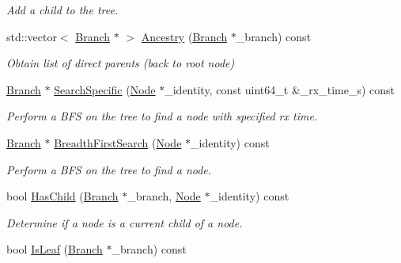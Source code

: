 \begin{DoxyCompactItemize}
\begin{DoxyCompactList}\small\item\em Add a child to the tree. \end{DoxyCompactList}\item 
std\+::vector$<$ \hyperlink{structosse_1_1collaborate_1_1_tree_1_1_branch}{Branch} $\ast$ $>$ \hyperlink{classosse_1_1collaborate_1_1_tree_ab7365c9a23acf7aac1070e0a9ee0c5d7}{Ancestry} (\hyperlink{structosse_1_1collaborate_1_1_tree_1_1_branch}{Branch} $\ast$\+\_\+branch) const
\begin{DoxyCompactList}\small\item\em Obtain list of direct parents (back to root node) \end{DoxyCompactList}\item 
\hyperlink{structosse_1_1collaborate_1_1_tree_1_1_branch}{Branch} $\ast$ \hyperlink{classosse_1_1collaborate_1_1_tree_a39e23eba696e4dbf520d9ad42c2c227d}{Search\+Specific} (\hyperlink{classosse_1_1collaborate_1_1_node}{Node} $\ast$\+\_\+identity, const uint64\+\_\+t \&\+\_\+rx\+\_\+time\+\_\+s) const
\begin{DoxyCompactList}\small\item\em Perform a B\+FS on the tree to find a node with specified rx time. \end{DoxyCompactList}\item 
\hyperlink{structosse_1_1collaborate_1_1_tree_1_1_branch}{Branch} $\ast$ \hyperlink{classosse_1_1collaborate_1_1_tree_acb3448871b41ab199db72e3cdd4e23c2}{Breadth\+First\+Search} (\hyperlink{classosse_1_1collaborate_1_1_node}{Node} $\ast$\+\_\+identity) const
\begin{DoxyCompactList}\small\item\em Perform a B\+FS on the tree to find a node. \end{DoxyCompactList}\item 
bool \hyperlink{classosse_1_1collaborate_1_1_tree_a1147a0288752f6af47f3b058b4e4d134}{Has\+Child} (\hyperlink{structosse_1_1collaborate_1_1_tree_1_1_branch}{Branch} $\ast$\+\_\+branch, \hyperlink{classosse_1_1collaborate_1_1_node}{Node} $\ast$\+\_\+identity) const
\begin{DoxyCompactList}\small\item\em Determine if a node is a current child of a node. \end{DoxyCompactList}\item 
bool \hyperlink{classosse_1_1collaborate_1_1_tree_ad93736258a744c9820176d4ee8172f8a}{Is\+Leaf} (\hyperlink{structosse_1_1collaborate_1_1_tree_1_1_branch}{Branch} $\ast$\+\_\+branch) const

\end{DoxyCompactItemize}
